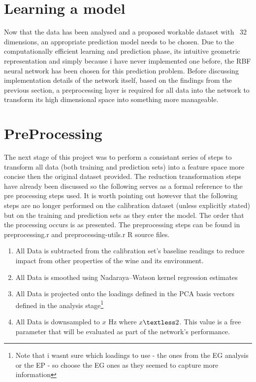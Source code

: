 \documentclass[twocolumn]{article}
\begin{document}
\section{Learning a model}
Now that the data has been analysed and a proposed workable dataset with ~32 dimensions, an appropriate prediction model needs to be chosen.
Due to the computationally efficient learning and prediction phase, its intuitive geometric representation and simply because i have never
implemented one before, the RBF neural network has been chosen for this prediction problem. Before discussing implementation details
of the network itself, based on the findings from the previous section, a preprocessing layer is required for all data into the network
to transform its high dimensional space into something more manageable. 
\section{PreProcessing}
The next stage of this project was to perform a consistant series of steps to transform all data (both training and prediction sets) into a
feature space more concise then the original dataset provided. The reduction transformation steps have already been discussed so the following
serves as a formal reference to the pre processing steps used. It is worth pointing out however that the following steps are no longer performed
on the calibration dataset (unless explicitly stated) but on the training and prediction sets as they enter the model. The order that the processing
occurs is as presented. The preprocessing steps can be found in preprocessing.r and preprocessing-utils.r R source files.

\begin{enumerate}
	\item All Data is subtracted from the calibration set's baseline readings to reduce impact from other properties of the wine and its environment.
	\item All Data is smoothed using Nadaraya–Watson kernel regression estimates
	\item All Data is projected onto the loadings defined in the PCA basis vectors defined in the analysis stage\footnote{Note that i wasnt
	      sure which loadings to use - the ones from the EG analysis or the EP - so choose the EG ones as they seemed to capture more information}
	\item All Data is downsampled to $x$ Hz where $x \textless 2$. This value is a free parameter that will be evaluated as part of the network's performance.
	
\end{enumerate}
\end{document}
